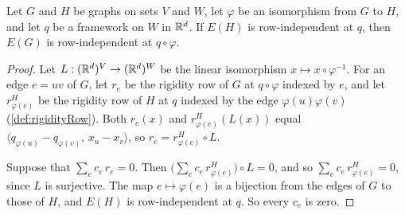 \begin{lemma}
  \label{lem:edgeSet-rowIndependent-iso}
  \leanok
  Let $G$ and $H$ be graphs on sets $V$ and $W$, let $\varphi$
  be an isomorphism from $G$ to $H$, and let $q$ be a framework on $W$
  in ${\mathbb{R}}^{d}$. If $E(H)$ is row-independent at $q$, then $E(G)$ is
  row-independent at $q \circ \varphi$.
\end{lemma}
\begin{proof}
  \leanok
  Let $L : ({\mathbb{R}}^{d})^{V} \to ({\mathbb{R}}^{d})^{W}$ be the linear isomorphism
  $x \mapsto x \circ \varphi^{-1}$. For an edge $e = uv$ of $G$, let
  $r_e$ be the rigidity row of $G$ at $q \circ \varphi$ indexed by $e$,
  and let $r^{H}_{\varphi(e)}$ be the rigidity row of $H$ at $q$
  indexed by the edge $\varphi(u)\varphi(v)$ (\cref{def:rigidityRow}).
  Both $r_e(x)$ and $r^{H}_{\varphi(e)}(L(x))$ equal
  $\langle q_{\varphi(u)} - q_{\varphi(v)},\, x_u - x_v \rangle$, so
  $r_e = r^{H}_{\varphi(e)} \circ L$.

  Suppose that $\sum_e c_e\, r_e = 0$. Then
  $\bigl(\sum_e c_e\, r^{H}_{\varphi(e)}\bigr) \circ L = 0$, and so
  $\sum_e c_e\, r^{H}_{\varphi(e)} = 0$, since $L$ is surjective. The
  map $e \mapsto \varphi(e)$ is a bijection from the edges of $G$ to
  those of $H$, and $E(H)$ is row-independent at $q$. So every $c_e$
  is zero.
\end{proof}

